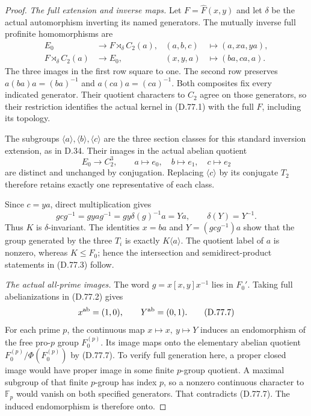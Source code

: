\begin{proof}
\emph{The full extension and inverse maps.}
Let $F=\widehat F(x,y)$ and let $\delta$ be the actual
automorphism inverting its named generators.
The mutually inverse full profinite homomorphisms are
\[
 \begin{aligned}
 E_0&\longrightarrow F\rtimes_\delta C_2(a),
       &(a,b,c)&\longmapsto(a,xa,ya),\\
 F\rtimes_\delta C_2(a)&\longrightarrow E_0,
       &(x,y,a)&\longmapsto(ba,ca,a).
 \end{aligned}                                                \tag{D.77.4}
\]
The three images in the first row square to one.
The second row preserves
$a(ba)a=(ba)^{-1}$ and $a(ca)a=(ca)^{-1}$.
Both composites fix every indicated generator.
Their quotient characters to $C_2$ agree on those
generators, so their restriction identifies the actual
kernel in (D.77.1) with the full $F$, including its topology.

The subgroups $\langle a\rangle,\langle b\rangle,\langle c\rangle$
are the three section classes for this standard inversion
extension, as in D.34. Their images in the actual
abelian quotient
\[
 E_0\longrightarrow C_2^3,\qquad
       a\longmapsto e_0,\quad b\longmapsto e_1,\quad
       c\longmapsto e_2
                                                               \tag{D.77.5}
\]
are distinct and unchanged by conjugation.
Replacing $\langle c\rangle$ by its conjugate $T_2$
therefore retains exactly one representative of each class.

Since $c=ya$, direct multiplication gives
\[
 gcg^{-1}=gya g^{-1}
        =g y\delta(g)^{-1}a=Ya,\qquad
 \delta(Y)=Y^{-1}.
                                                               \tag{D.77.6}
\]
Thus $K$ is $\delta$-invariant. The identities
$x=ba$ and $Y=(gcg^{-1})a$ show that the group generated
by the three $T_i$ is exactly $K\langle a\rangle$.
The quotient label of $a$ is nonzero, whereas $K\leq F_0$;
hence the intersection and semidirect-product statements
in (D.77.3) follow.

\emph{The actual all-prime images.}
The word $g=x[x,y]x^{-1}$ lies in $F_0'$.
Taking full abelianizations in (D.77.2) gives
\[
                     x^{\rm ab}=(1,0),\qquad
                     Y^{\rm ab}=(0,1).
                                                               \tag{D.77.7}
\]
For each prime $p$, the continuous map
$x\mapsto x,\ y\mapsto Y$ induces an endomorphism
of the free pro-$p$ group $F_0^{(p)}$.
Its image maps onto the elementary abelian quotient
$F_0^{(p)}/\Phi(F_0^{(p)})$ by (D.77.7).
To verify full generation here, a proper closed image
would have proper image in some finite $p$-group quotient.
A maximal subgroup of that finite $p$-group has index $p$,
so a nonzero continuous character to $\mathbb F_p$
would vanish on both specified generators.
That contradicts (D.77.7).
The induced endomorphism is therefore onto.


\end{proof}
